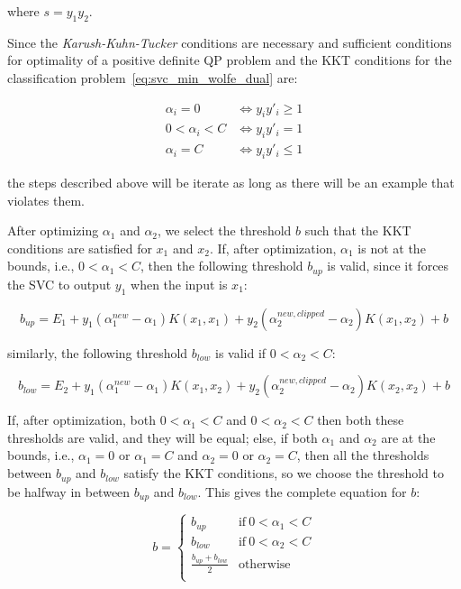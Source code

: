 where $s = y_1 y_2$.

Since the \emph{Karush-Kuhn-Tucker} conditions are necessary and sufficient conditions for optimality of a positive definite QP problem and the KKT conditions for the classification problem~\eqref{eq:svc_min_wolfe_dual} are:

\begin{equation} \label{eq:svc_smo_kkt}
	\begin{aligned}
		\alpha_i = 0 & \Leftrightarrow y_i y'_i \geq 1 \\
		0 < \alpha_i < C & \Leftrightarrow y_i y'_i = 1 \\
		\alpha_i = C & \Leftrightarrow y_i y'_i \leq 1
	\end{aligned}
\end{equation}

the steps described above will be iterate as long as there will be an example that violates them.

After optimizing $\alpha_1$ and $\alpha_2$, we select the threshold $b$ such that the KKT conditions are satisfied for $x_1$ and $x_2$. If, after optimization, $\alpha_1$ is not at the bounds, i.e., $0 < \alpha_1 < C$, then the following threshold $b_{up}$ is valid, since it forces the SVC to output $y_1$ when the input is $x_1$:

\begin{equation} \label{eq:smo_svc_b1}
	b_{up} = E_1 + y_1 (\alpha_1^{new} - \alpha_1) K(x_1,x_1) + y_2 (\alpha_2^{new,clipped} - \alpha_2) K(x_1,x_2) + b
\end{equation}

similarly, the following threshold $b_{low}$ is valid if $0 < \alpha_2 < C$:

\begin{equation} \label{eq:smo_svc_b2}
	b_{low} = E_2 + y_1 (\alpha_1^{new} - \alpha_1) K(x_1,x_2) + y_2 (\alpha_2^{new,clipped} - \alpha_2) K(x_2,x_2) + b
\end{equation}

If, after optimization, both $0 < \alpha_1 < C$ and $0 < \alpha_2 < C$ then both these thresholds are valid, and they will be equal; else, if both $\alpha_1$ and $\alpha_2$ are at the bounds, i.e., $\alpha_1 = 0$ or $\alpha_1 = C$ and $\alpha_2 = 0$ or $\alpha_2 = C$, then all the thresholds between $b_{up}$ and $b_{low}$ satisfy the KKT conditions, so we choose the threshold to be halfway in between $b_{up}$ and $b_{low}$. This gives the complete equation for $b$:

\begin{equation} \label{eq:smo_svc_b}
	b =
        \begin{cases}
            b_{up} & \text{if} \ 0 < \alpha_1 < C \\
            b_{low} & \text{if} \ 0 < \alpha_2 < C \\
            \displaystyle \frac{b_{up}+b_{low}}{2} & \text{otherwise} \\
        \end{cases}
\end{equation}

